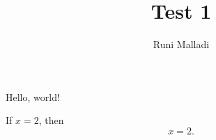 \documentclass[12pt]{article}
\title{Test 1}
\author{Runi Malladi}
\begin{document}
\maketitle

Hello, world!

If $x=2$, then 
\begin{equation}
	x=2.
\end{equation}
\end{document}
